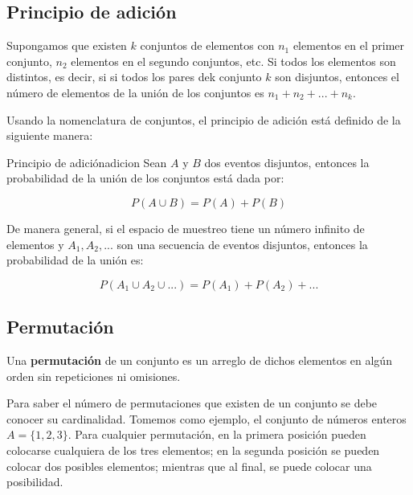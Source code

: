 \subsection{Principio de adición}

Supongamos que existen $k$ conjuntos de elementos con $n_1$ elementos en el
primer conjunto, $n_2$ elementos en el segundo conjuntos, etc. Si todos los
elementos son distintos, es decir, si si todos los pares dek conjunto $k$ son
disjuntos, entonces el número de elementos de la unión de los conjuntos es $n_1
+ n_2 + ... + n_k $.

Usando la nomenclatura de conjuntos, el principio de adición está definido de la
siguiente manera:

\begin{theorem}{Principio de adición}{adicion}
Sean $A$ y $B$ dos eventos disjuntos, entonces la probabilidad de la unión de
los conjuntos está dada por:

\begin{equation}
	P(A \cup B) = P(A) + P(B)
\end{equation}

De manera general, si el espacio de muestreo tiene un número infinito de
elementos y $A_1, A_2, ... $ son una secuencia de eventos disjuntos, entonces la
probabilidad de la unión es:

\begin{equation}
	P(A_1 \cup A_2 \cup ...) = P(A_1) + P(A_2) + ...
\end{equation}

\end{theorem}

\subsection{Permutación}


\begin{tcolorbox}[colback=blue!5!white,colframe=blue!60!black,title=Definición: Permutación]
	Una \textbf{permutaci\'on} de un conjunto es un arreglo de dichos elementos en
	alg\'un orden sin repeticiones ni omisiones.
		\label{Permutaciones_definition}
\end{tcolorbox}

Para saber el n\'umero de permutaciones que existen de un conjunto se debe
conocer su cardinalidad. Tomemos como ejemplo, el conjunto de n\'umeros enteros
$A=\{1, 2, 3\}$. Para cualquier permutaci\'on, en la primera posici\'on pueden
colocarse cualquiera de los tres elementos; en la segunda posición se pueden
colocar dos posibles elementos; mientras que al final, se puede colocar una
posibilidad.

